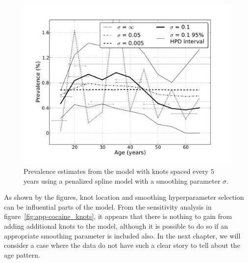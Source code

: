     \begin{figure}[h]
        \begin{center}
            \includegraphics[width=\textwidth]{applications/cocaine_dependence-smoothing.pdf}
            \caption[Prevalence estimates of cocaine dependence using a
              smoothing parameter.]{Prevalence estimates from the model
              with knots spaced every $5$ years
              using a penalized spline model with a smoothing
              parameter $\sigma$. }
        \label{fig:app-cocaine_smoothing}
        \end{center}
    \end{figure}

As shown by the figures, knot location and smoothing
hyperparameter selection can be influential parts of the model.
From the sensitivity analysis in figure~\ref{fig:app-cocaine_knots},
it appears that there is nothing to gain from adding additional
knots to the model, although it is possible to do so if an appropriate
smoothing parameter is included also.  In the next chapter, we will
consider a case where the data do not have such a clear story to
tell about the age pattern.
